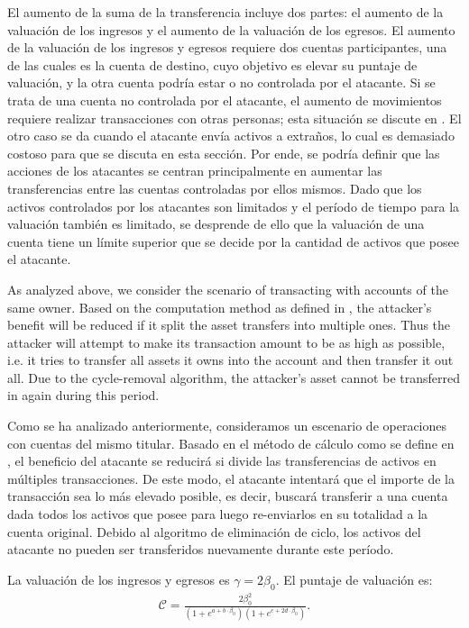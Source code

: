 El aumento de la suma de la transferencia incluye dos partes: el aumento de la valuación de los ingresos y el aumento de la valuación de los egresos. El aumento de la valuación de los ingresos y egresos requiere dos cuentas participantes, una de las cuales es la cuenta de destino, cuyo objetivo es elevar su puntaje de valuación, y la otra cuenta podría estar o no controlada por el atacante. Si se trata de una cuenta no controlada por el atacante, el aumento de movimientos requiere realizar transacciones con otras personas; esta situación se discute en . El otro caso se da cuando el atacante envía activos a extraños, lo cual es demasiado costoso para que se discuta en esta sección. Por ende, se podría definir que las acciones de los atacantes se centran principalmente en aumentar las transferencias entre las cuentas controladas por ellos mismos. Dado que los activos controlados por los atacantes son limitados y el período de tiempo para la valuación también es limitado, se desprende de ello que la valuación de una cuenta tiene un límite superior que se decide por la cantidad de activos que posee el atacante.

As analyzed above, we consider the scenario of transacting with accounts of the
same owner. Based on the computation method  as defined in , the attacker's benefit will be reduced if it split the asset transfers into multiple ones. Thus the attacker will attempt to make its transaction amount to be as high as possible, i.e. it tries to transfer all assets it owns into the account and then transfer it out all. Due to the cycle-removal algorithm, the attacker's asset cannot be transferred in again during this period.

Como se ha analizado anteriormente, consideramos un escenario de operaciones con cuentas del mismo titular. Basado en el método de cálculo  como se define en , el beneficio del atacante se reducirá si divide las transferencias de activos en múltiples transacciones. De este modo, el atacante intentará que el importe de la transacción sea lo más elevado posible, es decir, buscará transferir a una cuenta dada todos los activos que posee para luego re-enviarlos en su totalidad a la cuenta original. Debido al algoritmo de eliminación de ciclo, los activos del atacante no pueden ser transferidos nuevamente durante este período.

La valuación de los ingresos y egresos es $\gamma = 2 \beta_0$. El puntaje de valuación es:
\begin{align}
\mathcal{C} =  \frac{2 \beta_0 ^2}{ (1+e^{a + b \cdot \beta_0}) (1+e^{c + 2 d
  \cdot \beta_0})}.
\end{align}

